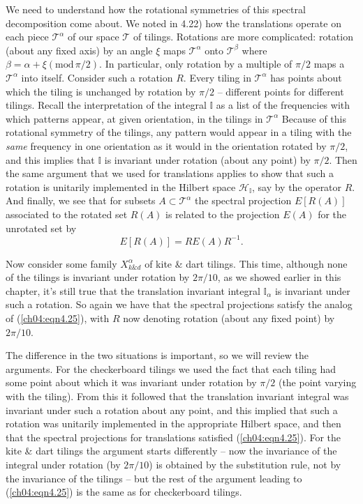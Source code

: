 \documentclass[reqno]{stml-l}
\theoremstyle{plain}
\theoremstyle{definition}
\numberwithin{equation}{chapter}
\begin{document}
We need to understand how the rotational symmetries of this spectral decomposition come about. We noted in 4.22) how the translations operate on each piece $\mathcal{T}^{\alpha}$ of our space $\mathcal{T}$ of tilings. Rotations are more complicated: rotation (about any fixed axis) by an angle $\xi$ maps $\mathcal{T}^{\alpha}$ onto $\mathcal{T}^{\beta}$ where $\beta=\alpha+\xi (\mathrm{mod}\,\pi/2)$. In particular, only rotation by a multiple of $\pi/2$ maps a $\mathcal{T}^{\alpha}$ into itself. Consider such a rotation $R$. Every tiling in $\mathcal{T}^{\alpha}$ has points about which the tiling is unchanged by rotation by $\pi/2$ -- different points for different tilings. Recall the interpretation of the integral $\mathbb{I}$ as a list of the frequencies with which patterns appear, at given orientation, in the tilings in $\mathcal{T}^{\alpha}$ Because of this rotational symmetry of the tilings, any pattern would appear in a tiling with the \emph{same} frequency in one orientation as it would in the orientation rotated by $\pi/2$, and this implies that $\mathbb{I}$ is invariant under rotation (about any point) by $\pi/2$. Then the same argument that we used for translations applies to show that such a rotation is unitarily implemented in the Hilbert space $\mathcal{H}_{\mathbb{I}}$, say by the operator $R$. And finally, we see that for subsets $A\subset \mathcal{T}^{\alpha}$ the spectral projection $E[R(A)]$ associated to the rotated set $R(A)$ is related to the projection $E(A)$ for the unrotated set by
\begin{equation}\label{ch04:eqn4.25}
E[R(A)]=RE(A)R^{-1}.
\end{equation}

Now consider some family $X_{k\& d}^{\alpha}$ of kite \&
dart tilings. This time, although none of the tilings is
invariant under rotation by $2\pi/10$, as we showed earlier
in this chapter, it's still true that the translation
invariant integral $\mathbb{I}_{\alpha}$ is invariant under
such a rotation. So again we have that the spectral
projections satisfy the analog of (\ref{ch04:eqn4.25}),
with $R$ now denoting rotation (about any fixed point) by
$2\pi/10$.

The difference in the two situations is important, so we will review the arguments. For the checkerboard tilings we used the fact that each tiling had some point about which it was invariant under rotation by $\pi/2$ (the point varying with the tiling). From this it followed that the translation invariant integral was invariant under such a rotation about any point, and this implied that such a rotation was unitarily implemented in the appropriate Hilbert space, and then that the spectral projections for translations satisfied (\ref{ch04:eqn4.25}). For the kite \& dart tilings the argument starts differently -- now the invariance of the integral under rotation (by $2\pi/10$) is obtained by the substitution rule, not by the invariance of the tilings -- but the rest of the argument leading to (\ref{ch04:eqn4.25}) is the same as for checkerboard tilings.
\end{document}
